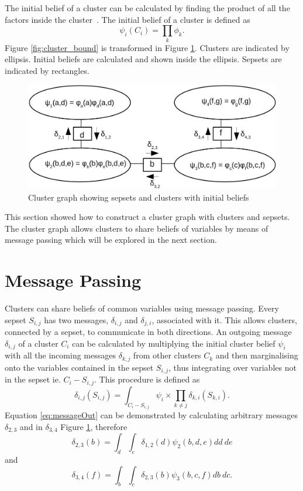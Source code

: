 \documentclass[12pt,oneside,openany,a4paper, %
afrikaans,english,
]{memoir}
\numberwithin{equation}{chapter}
\begin{document}
The initial belief of a cluster can be calculated by finding the product of all the factors inside the cluster~\citep{koller}. The initial belief of a cluster is defined as
\begin{equation}
\psi_i(C_i) = \prod_{k}\phi_k.
\end{equation}
Figure \ref{fig:cluster_bound} is transformed in Figure \ref{fig:clustergraph}. Clusters are indicated by ellipsis. Initial beliefs are calculated and shown inside the ellipsis. Sepsets are indicated by rectangles.
\begin{figure}[H]
  \includegraphics[width=0.7\linewidth]{Figures/clustergraph.png}
  \centering
  \caption{Cluster graph showing sepsets and clusters with initial beliefs}
  \label{fig:clustergraph}
\end{figure}
This section showed how to construct a cluster graph with clusters and sepsets. The cluster graph allows clusters to share beliefs of variables by means of message passing which will be explored in the next section. 
\section{Message Passing}
Clusters can share beliefs of common variables using message passing. Every sepset $S_{i,j}$ has two messages, $\delta_{i, j}$ and $\delta_{j,i}$, associated with it. This allows clusters, connected by a sepset, to communicate in both directions. An outgoing message $\delta_{i,j}$ of a cluster $C_i$ can be calculated by multiplying the initial cluster belief $\psi_i$ with all the incoming messages $\delta_{k,j}$ from other clusters $C_k$ and then marginalising onto the variables contained in the sepset $S_{i,j}$, thus integrating over variables not in the sepset ie. $C_i - S_{i,j}$. This procedure is defined as~\citep{koller}
\begin{equation}\label{eq:messageOut}
\delta_{i,j}(S_{i,j}) = \int_{C_i - S_{i,j}}\psi_i \times \prod_{k\ne j} \delta_{k,i}(S_{k,i}).
\end{equation}
Equation \ref{eq:messageOut} can be demonstrated by calculating arbitrary messages $\delta_{2,3}$ and in $\delta_{3,4}$ Figure \ref{fig:clustergraph}, therefore
\begin{equation}
\delta_{2,3}(b) = \int_d \int_e \delta_{1,2}(d)\psi_2(b,d,e)dd\ de
\end{equation}
and
\begin{equation}
\delta_{3,4}(f) = \int_b \int_c \delta_{2,3}(b)\psi_3(b,c,f)db\ dc.
\end{equation}
\end{document}

